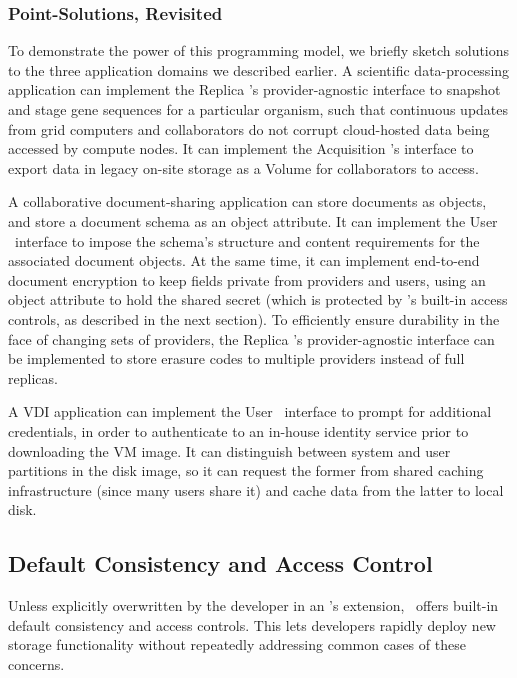 \subsubsection{Point-Solutions, Revisited}

To demonstrate the power of this programming model, we briefly sketch
solutions to the three application domains we described earlier.  A
scientific data-processing application can implement the Replica \SG's
provider-agnostic interface to snapshot and stage gene sequences for a
particular organism, such that continuous updates from grid computers
and collaborators do not corrupt cloud-hosted data being accessed by
compute nodes.  It can implement the Acquisition \SG's interface to
export data in legacy on-site storage as a Volume for collaborators to
access.

A collaborative document-sharing application can store documents as objects, and
store a document schema as an object attribute. It can implement the User \SG\ interface
to impose the schema's structure and content requirements for the associated document objects.
At the same time, it can implement end-to-end document
encryption to keep fields private from providers and users, using an object attribute 
to hold the shared secret (which is protected by \Syndicate's built-in access controls,
as described in the next section).  To efficiently ensure durability in the face of 
changing sets of providers, the Replica \SG's provider-agnostic interface can 
be implemented to store erasure codes to multiple providers instead of full replicas.

A VDI application can implement the User \SG\
interface to prompt for additional credentials, in order to authenticate to an 
in-house identity service prior to downloading the VM image.
It can distinguish between system and user partitions in the disk image, so it  
can request the former from shared caching infrastructure (since many users 
share it) and cache data from the latter to local disk.

\subsection{Default Consistency and Access Control}
\label{sec:consistency}

Unless explicitly overwritten by the developer in an \SG's extension,
\Syndicate\ offers built-in default consistency and access controls.
This lets developers rapidly deploy new storage functionality 
without repeatedly addressing common cases of these concerns.

